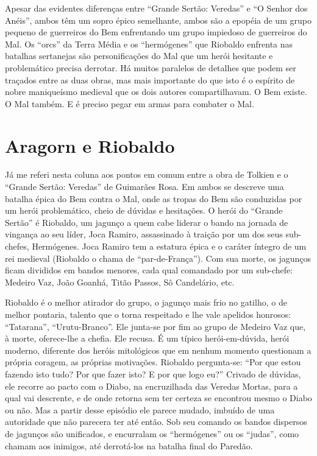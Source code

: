 Apesar das evidentes diferenças entre “Grande Sertão: Veredas” e “O
Senhor dos Anéis”, ambos têm um sopro épico semelhante, ambos são a
epopéia de um grupo pequeno de guerreiros do Bem enfrentando um grupo
impiedoso de guerreiros do Mal. Os “orcs” da Terra Média e os
“hermógenes” que Riobaldo enfrenta nas batalhas sertanejas são
personificações do Mal que um herói hesitante e problemático precisa
derrotar. Há muitos paralelos de detalhes que podem ser traçados
entre as duas obras, mas mais importante do que isto é o espírito de
nobre maniqueísmo medieval que os dois autores compartilhavam. O Bem
existe. O Mal também. E é preciso pegar em armas para combater o Mal.

\chapter{Aragorn e Riobaldo}

Já me referi nesta coluna aos pontos em comum entre a obra de Tolkien
e o “Grande Sertão: Veredas” de Guimarães Rosa. Em ambos se descreve
uma batalha épica do Bem contra o Mal, onde as tropas do Bem são
conduzidas por um herói problemático, cheio de dúvidas e hesitações.
O herói do “Grande Sertão” é Riobaldo, um jagunço a quem cabe liderar
o bando na jornada de vingança ao seu líder, Joca Ramiro, assassinado
à traição por um dos seus sub-chefes, Hermógenes. Joca Ramiro tem a
estatura épica e o caráter íntegro de um rei medieval (Riobaldo o
chama de “par-de-França”). Com sua morte, os jagunços ficam divididos
em bandos menores, cada qual comandado por um sub-chefe: Medeiro Vaz,
João Goanhá, Titão Passos, Sô Candelário, etc.

Riobaldo é o melhor atirador do grupo, o jagunço mais frio no gatilho,
o de melhor pontaria, talento que o torna respeitado e lhe vale
apelidos honrosos: “Tatarana”, “Urutu-Branco”. Ele junta-se por fim
ao grupo de Medeiro Vaz que, à morte, oferece-lhe a chefia. Ele
recusa. É um típico herói-em-dúvida, herói moderno, diferente dos
heróis mitológicos que em nenhum momento questionam a própria
coragem, as próprias motivações. Riobaldo pergunta-se: “Por que estou
fazendo isto tudo? Por que fazer isto? E por que logo eu?” Crivado de
dúvidas, ele recorre ao pacto com o Diabo, na encruzilhada das
Veredas Mortas, para a qual vai descrente, e de onde retorna sem ter
certeza se encontrou mesmo o Diabo ou não. Mas a partir desse
episódio ele parece mudado, imbuído de uma autoridade que não
parecera ter até então. Sob seu comando os bandos dispersos de
jagunços são unificados, e encurralam os “hermógenes” ou os “judas”,
como chamam aos inimigos, até derrotá-los na batalha final do
Paredão.

